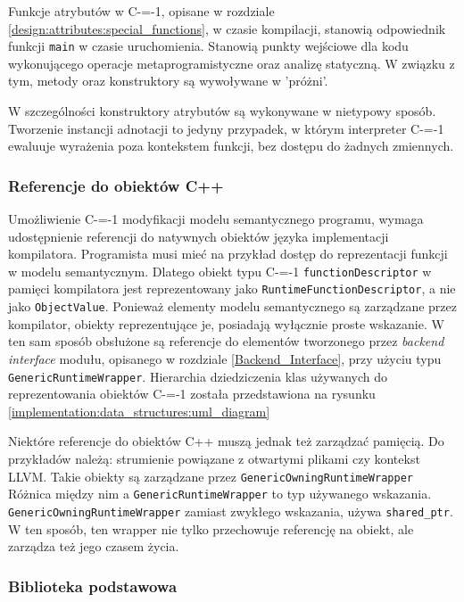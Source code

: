Funkcje atrybutów w C-=-1, opisane w rozdziale \ref{design:attributes:special_functions}, w czasie kompilacji, stanowią odpowiednik funkcji \lstinline{main} w czasie uruchomienia.
Stanowią punkty wejściowe dla kodu wykonującego operacje metaprogramistyczne oraz analizę statyczną.
W związku z tym, metody oraz konstruktory są wywoływane w 'próżni'.

W szczególności konstruktory atrybutów są wykonywane w nietypowy sposób.
Tworzenie instancji adnotacji to jedyny przypadek, w którym interpreter C-=-1 ewaluuje wyrażenia poza kontekstem funkcji, bez dostępu do żadnych zmiennych.


\subsubsection{Referencje do obiektów C++}
\label{implementation:interpreter:cpp_object_references}

Umożliwienie C-=-1 modyfikacji modelu semantycznego programu, wymaga udostępnienie referencji do natywnych obiektów języka implementacji kompilatora. %
Programista musi mieć na przykład dostęp do reprezentacji funkcji w modelu semantycznym.
Dlatego obiekt typu C-=-1 \lstinline{functionDescriptor} w pamięci kompilatora jest reprezentowany jako \lstinline{RuntimeFunctionDescriptor}, a nie jako \lstinline{ObjectValue}.
Ponieważ elementy modelu semantycznego są zarządzane przez kompilator, obiekty reprezentujące je, posiadają wyłącznie proste wskazanie.
W ten sam sposób obsłużone są referencje do elementów tworzonego przez \emph{backend interface} modułu, opisanego w rozdziale \ref{Backend_Interface}, przy użyciu typu \lstinline{GenericRuntimeWrapper}.
Hierarchia dziedziczenia klas używanych do reprezentowania obiektów C-=-1 została przedstawiona na rysunku \ref{implementation:data_structures:uml_diagram}

Niektóre referencje do obiektów C++ muszą jednak też zarządzać pamięcią.
Do przykładów należą: strumienie powiązane z otwartymi plikami czy kontekst LLVM.
Takie obiekty są zarządzane przez \lstinline{GenericOwningRuntimeWrapper}
Różnica między nim a \lstinline{GenericRuntimeWrapper} to typ używanego wskazania.
\lstinline{GenericOwningRuntimeWrapper} zamiast zwykłego wskazania, używa \lstinline{shared_ptr}.
W ten sposób, ten wrapper nie tylko przechowuje referencję na obiekt, ale zarządza też jego czasem życia.

\subsubsection{Biblioteka podstawowa}
\label{implementation:interpreter:basic_library}

